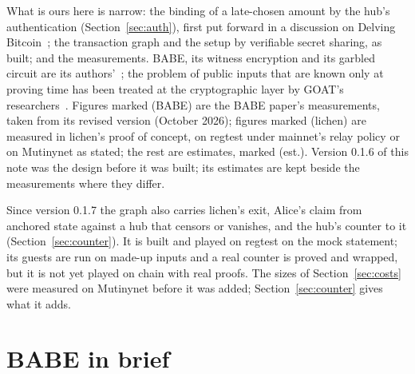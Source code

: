 \documentclass[11pt]{article}
\begin{document}
What is ours here is narrow: the binding of a late-chosen amount by the
hub's authentication (Section~\ref{sec:auth}), first put forward in a
discussion on Delving Bitcoin~\cite{delving}; the transaction graph and
the setup by verifiable secret sharing, as built; and the measurements.
BABE, its witness encryption and its garbled circuit are its
authors'~\cite{babe,gkpw24,argo}; the problem of public inputs that are
known only at proving time has been treated at the cryptographic layer by
GOAT's researchers~\cite{goat}. Figures marked (BABE) are the BABE
paper's measurements, taken from its revised version (October 2026);
figures marked (lichen) are measured in lichen's proof of concept, on
regtest under mainnet's relay policy or on Mutinynet as stated; the rest
are estimates, marked (est.). Version 0.1.6 of this note was the design
before it was built; its estimates are kept beside the measurements where
they differ.

Since version 0.1.7 the graph also carries lichen's exit, Alice's claim
from anchored state against a hub that censors or vanishes, and the
hub's counter to it (Section~\ref{sec:counter}). It is built and played
on regtest on the mock statement; its guests are run on made-up inputs
and a real counter is proved and wrapped, but it is not yet played on
chain with real proofs. The sizes of
Section~\ref{sec:costs} were measured on Mutinynet before it was added;
Section~\ref{sec:counter} gives what it adds.

\section{BABE in brief}
\label{sec:babe}
\end{document}
